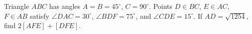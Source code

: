 Triangle $ ABC $ has angles $ A=B=45^\circ $, $ C=90^\circ $. Points $ D\in BC $, $ E\in AC $, $ F\in AB $ satisfy $\angle DAC=30^\circ $, $\angle BDF=75^\circ $, and $\angle CDE=15^\circ $. If $ AD=\sqrt{1254}$, find $ 2[AFE]+[DFE]$.
